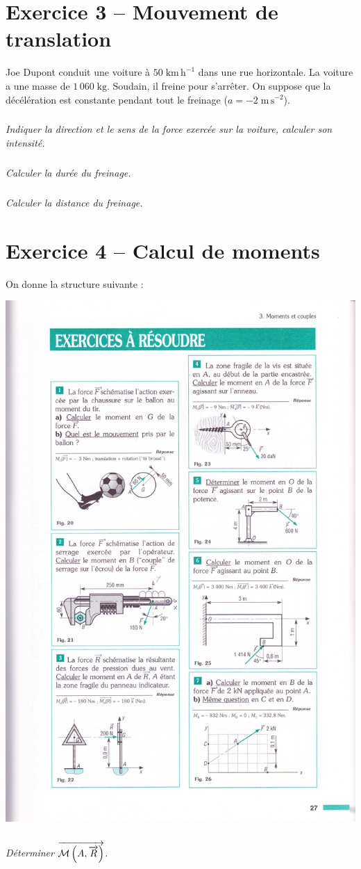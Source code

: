 \documentclass[10pt,fleqn]{article} %
\begin{document}
\begin{multicols}{2}
\section*{Exercice 3 -- Mouvement de translation}

Joe Dupont conduit une voiture à $50\; \text{km}\,\text{h}^{-1}$ dans une rue horizontale. La voiture a une masse de $1\,060\; \text{kg}$. Soudain, il freine pour s’arrêter.  On suppose que la décélération est constante pendant tout le freinage ($a = -2\; \text{m}\,\text{s}^{-2}$).

\subparagraph{}
\textit{Indiquer la direction et le sens de la force exercée sur la voiture, calculer son intensité.}

\subparagraph{}
\textit{Calculer la durée du freinage.}

\subparagraph{}
\textit{Calculer la distance du freinage.}


\section*{Exercice 4 -- Calcul de moments}

\setcounter{subparagraph}{0}
On donne la structure suivante : 
\begin{center}
\includegraphics[width=.6\linewidth]{images/moment8}
\end{center}

\subparagraph{}
\textit{Déterminer $\overrightarrow{\mathcal{M}\left(A,\overrightarrow{R} \right)}$.}


\end{multicols}
\end{document}
